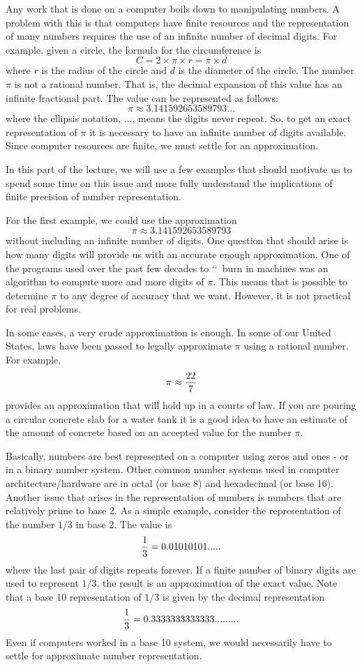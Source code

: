 \documentclass[10pt,fleqn]{article}
\begin{document}
Any work that is done on a computer boils down to manipulating numbers. A
problem with this is that computers have finite resources and the representation
of many numbers requires the use of an infinite number of decimal digits. For
example, given a circle, the formula for the circumference is
$$C = 2 \times \pi \times r = \pi \times d$$
where $r$ is the radius of the circle and $d$ is the diameter of the circle. The
number $\pi$ is not a rational number. That is, the decimal expansion of this
value has an infinite fractional part. The value can be represented as follows:
$$\pi\approx 3.141592653589793...$$
where the ellipsis notation, $...$, means the digits never repeat. So, to get an
exact representation of $\pi$ it is necessary to have an infinite number of
digits available. Since computer resources are finite, we must settle for an
approximation.

In this part of the lecture, we will use a few examples that should motivate us
to spend some time on this issue and more fully understand the implications of
finite precision of number representation.

For the first example, we could use the approximation
$$\pi\approx 3.141592653589793$$
without including an infinite number of digits. One question that should arise
is how many digits will provide us with an accurate enough approximation. One
of the programs used over the past few decades to \lq\lq\ burn in machines was
an algorithm to compute more and more digits of $\pi$. This means that is
possible to determine $\pi$ to any degree of accuracy that we want. However, it
is not practical for real problems.

In some cases, a very crude approximation is enough. In some of our United
States, laws have been passed to legally approximate $\pi$ using a rational
number. For example,
$$\pi\approx {{22}\over 7}$$
provides an approximation that will hold up in a courts of law. If you are
pouring a circular concrete slab for a water tank it is a good idea to have an
estimate of the amount of concrete based on an accepted value for the number
$\pi$.

Basically, numbers are best represented on a computer using zeros and ones -
or in a binary number system. Other common number systems used in computer
architecture/hardware are in octal (or base 8) and hexadecimal (or base 16).
Another issue that arises in the representation of numbers is numbers that are
relatively prime to base 2. As a simple example, consider the representation of
the number $1/3$ in base 2.  The value is
$${1\over 3} = 0.01010101.....$$
where the last pair of digits repeats forever. If a finite number of binary
digits are used to represent $1/3$, the result is an approximation of the exact
value. Note that a base 10 representation of $1/3$ is given by the decimal
representation
$${1\over 3} = 0.3333333333333.........$$
Even if computers worked in a base 10 system, we would necessarily have to
settle for approximate number representation.
\end{document}
